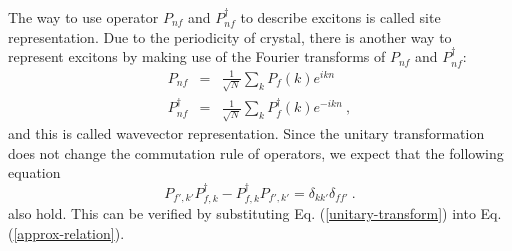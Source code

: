 The way to use operator $P_{nf}$ and $P_{nf}^{\dagger}$ to describe excitons is called site representation. Due to the periodicity of crystal, there is another way to represent excitons by making use of the Fourier transforms of $P_{nf}$ and $P_{nf}^{\dagger}$: 
\begin{eqnarray}
P_{nf} &=& \frac{1}{\sqrt{N}} \sum_{k} P_{f}(k) e^{ikn} \nonumber \\
P_{nf}^{\dagger} &=& \frac{1}{\sqrt{N}} \sum_{k} P_{f}^{\dagger}(k) e^{-ikn} \ , \label{unitary-transform}
\end{eqnarray}
and this is called wavevector representation. Since the unitary transformation does not change the commutation rule of operators, we expect that the following equation
\begin{equation}
P_{f',k'}P_{f,k}^{\dagger} - P_{f,k}^{\dagger}P_{f',k'}=\delta_{kk'}\delta_{ff'} \ . \label{approx-relation-in-wavevector}
\end{equation}
also hold. This can be verified by substituting Eq. (\ref{unitary-transform}) into Eq. (\ref{approx-relation}). 





